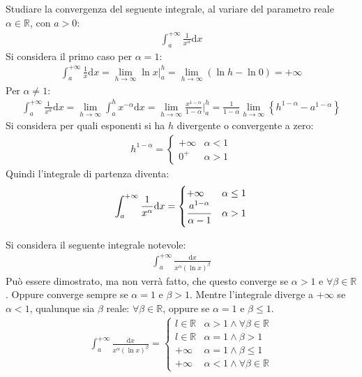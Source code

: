\documentclass{article}
\newcommand{\df}{\mathrm{d}}
\newcommand{\intab}[4]{\displaystyle\int_{#1}^{#2}{#3}\df{#4}}
\numberwithin{equation}{subsection}
\begin{document}
Studiare la convergenza del seguente integrale, al variare del parametro reale $\alpha\in\mathbb{R}$, con $a>0$:
\begin{gather*}
    \intab{a}{+\infty}{\frac{1}{x^\alpha}}{x}
\end{gather*}
Si considera il primo caso per $\alpha=1$:
\begin{gather*}
    \displaystyle\int_a^{+\infty}\frac{1}{x}\df x=\lim_{h\to\infty}\ln x\bigg|_a^h=\lim_{h\to\infty}(\ln h-\ln 0)=+\infty
\end{gather*}
Per $\alpha\neq1$:
\begin{gather*}
    \intab{a}{+\infty}{\frac{1}{x^\alpha}}{x}=\lim_{h\to\infty}\int_a^{h}x^{-\alpha}\df x=\lim_{h\to\infty}\frac{x^{1-\alpha}}{1-\alpha}\bigg|_a^h=
    \frac{1}{1-\alpha}\lim_{h\to\infty}\left\{h^{1-\alpha}-a^{1-\alpha}\right\}
\end{gather*}
Si considera per quali esponenti si ha $h$ divergente o convergente a zero:
\begin{gather*}
    h^{1-\alpha}=\begin{cases}
        +\infty & \alpha<1\\
        0^+ & \alpha>1
    \end{cases}
\end{gather*}
Quindi l'integrale di partenza diventa:
\begin{gather}
    \intab{a}{+\infty}{\frac{1}{x^\alpha}}{x}=
    \begin{cases}
        +\infty& \alpha\leq1\\
        \displaystyle\frac{\strut a^{1-\alpha}}{\strut\alpha-1}&\alpha>1
    \end{cases}
\end{gather}


Si considera il seguente integrale notevole:
\begin{gather*}
    \displaystyle\int_{a}^{+\infty}\frac{\df x}{x^\alpha(\ln x)^\beta}
\end{gather*}
Può essere dimostrato, ma non verrà fatto, che questo converge se $\alpha>1$ e $\forall\beta\in\mathbb{R}$. Oppure converge sempre se $\alpha=1$ e $\beta>1$. Mentre l'integrale diverge a $+\infty$ se $\alpha<1$, qualunque sia $\beta$ reale: $\forall\beta\in\mathbb{R}$, oppure se $\alpha=1$ e $\beta\leq1$. 
\begin{gather}
    \displaystyle\int_{a}^{+\infty}\frac{\df x}{x^\alpha(\ln x)^\beta}=\begin{cases}
        l\in\mathbb{R}&\alpha>1\land\forall\beta\in\mathbb{R}\\
        l\in\mathbb{R}&\alpha=1\land\beta>1\\
        +\infty&\alpha=1\land\beta\leq1\\
        +\infty&\alpha<1\land\forall\beta\in\mathbb{R}
    \end{cases}    
\end{gather}
\end{document}
